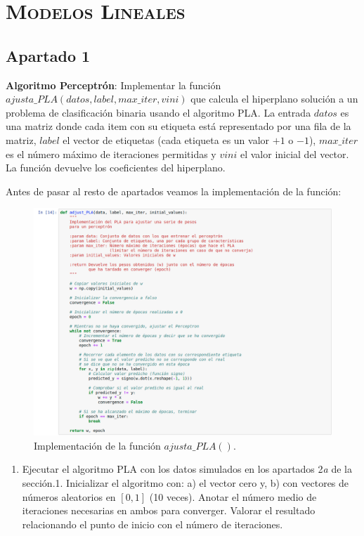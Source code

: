 \documentclass[11pt,a4paper]{article}
\begin{document}
\section{\textsc{Modelos Lineales}}

\subsection*{Apartado 1}

\noindent \textbf{Algoritmo Perceptrón}: Implementar la función
$ajusta\_PLA(datos, label, max\_iter, vini)$ que calcula el hiperplano solución a un problema de
clasificación binaria usando el algoritmo PLA. La entrada $datos$ es una matriz donde cada item con
su etiqueta está representado por una fila de la matriz, $label$ el vector de etiquetas (cada etiqueta
es un valor $+1$ o $-1$), $max\_iter$ es el número máximo de iteraciones permitidas y $vini$ el valor
inicial del vector. La función devuelve los coeficientes del hiperplano.

Antes de pasar al resto de apartados veamos la implementación de la función:

\begin{figure}[H]
\centering
\includegraphics[scale=0.4]{img/adjust_pla.png}
\caption{Implementación de la función $ajusta\_PLA()$.}
\end{figure}

\begin{enumerate}[label=\textit{\alph*})]
	\item Ejecutar el algoritmo PLA con los datos simulados en los apartados 2\textit{a} de la
	sección.1. Inicializar el algoritmo con: a) el vector cero y, b) con vectores de números
	aleatorios en $[0, 1]$ (10 veces). Anotar el número medio de iteraciones necesarias en ambos para
	converger. Valorar el resultado relacionando el punto de inicio con el número de iteraciones.
\end{enumerate}
\end{document}
